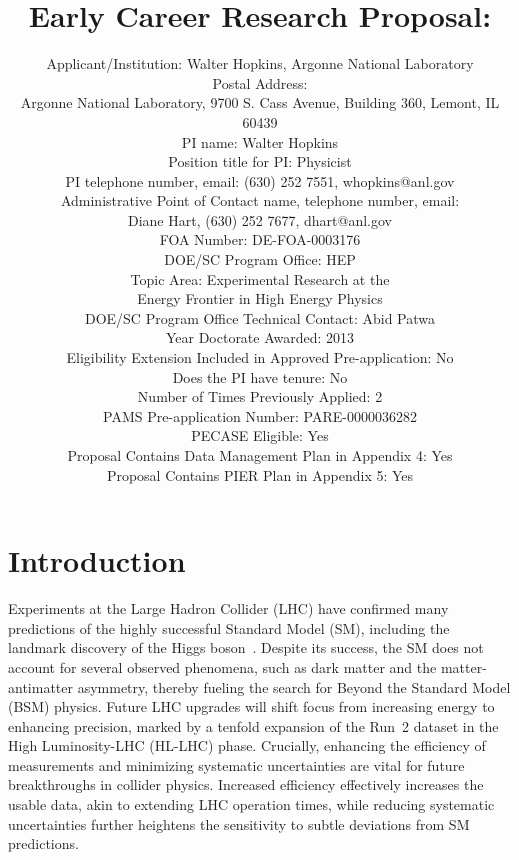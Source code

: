 \documentclass[letter, USenglish, 11pt, subfigure]{article}
\title{Early Career Research Proposal: \\}
\author{Applicant/Institution: Walter Hopkins, Argonne National Laboratory\\ Postal Address: \\Argonne National Laboratory, 9700 S. Cass Avenue, Building 360, Lemont, IL 60439
  \\PI name: Walter Hopkins\\Position title for PI: Physicist\\PI telephone number, email: (630) 252 7551, whopkins@anl.gov\\Administrative Point of Contact name, telephone number, email:\\Diane Hart, (630) 252 7677, dhart@anl.gov\\FOA Number: DE-FOA-0003176\\DOE/SC Program Office: HEP\\ Topic Area: Experimental Research at the \\Energy Frontier in High Energy Physics\\DOE/SC Program Office Technical Contact: Abid Patwa\\Year Doctorate Awarded: 2013\\Eligibility Extension Included in Approved Pre-application: No\\Does the PI have tenure: No\\Number of Times Previously Applied: 2\\PAMS Pre-application Number: PARE-0000036282\\PECASE Eligible: Yes\\Proposal Contains Data Management Plan in Appendix 4: Yes\\Proposal Contains PIER Plan in Appendix 5: Yes
}
\date{}
\begin{document}

% 

\maketitle
\clearpage
\tableofcontents
\thispagestyle{empty}

\clearpage
{} 
\section{Introduction}

Experiments at the Large Hadron Collider (LHC) have confirmed many predictions of the highly successful Standard Model (SM), including the landmark discovery of the Higgs boson~\cite{HIGG-2012-27,CMS-HIG-12-028}. Despite its success, the SM does not account for several observed phenomena, such as dark matter and the matter-antimatter asymmetry, thereby fueling the search for Beyond the Standard Model (BSM) physics. Future LHC upgrades will shift focus from increasing energy to enhancing precision, marked by a tenfold expansion of the Run~2 dataset in the High Luminosity-LHC (HL-LHC) phase. Crucially, enhancing the efficiency of measurements and minimizing systematic uncertainties are vital for future breakthroughs in collider physics. Increased efficiency effectively increases the usable data, akin to extending LHC operation times, while reducing systematic uncertainties further heightens the sensitivity to subtle deviations from SM predictions.
\end{document}
